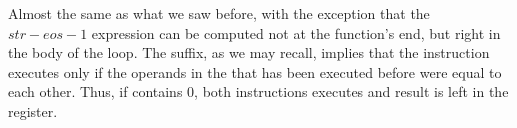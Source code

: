 \mysubparagraph{\OptimizingKeilVI (\ARMMode)}




Almost the same as what we saw before, with the exception that the $str - eos - 1$ 
expression can be computed not at the function's end, but right in the body of the loop.
The  suffix, as we may recall, implies that the instruction executes only if the operands in
the \CMP that has been executed before were equal to each other.
Thus, if  contains 0, both  instructions executes and result is left in the  register.

